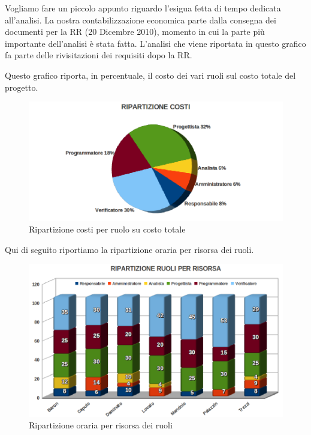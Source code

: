 \vspace{0.8cm}
 
Vogliamo fare un piccolo appunto riguardo l'esigua fetta di tempo dedicata
all'analisi. La nostra contabilizzazione economica parte dalla consegna dei documenti per 
la RR (20 Dicembre 2010), momento in cui la parte pi\`u importante dell'analisi \`e stata fatta.
L'analisi che viene riportata in questo grafico fa parte delle
rivisitazioni dei requisiti dopo la RR.\\
\newpage

Questo grafico riporta, in percentuale, il costo dei vari ruoli sul costo totale
del progetto.

\vspace{0cm}
\begin{figure}[htbp]
  \centering
  \includegraphics[width=17.2cm, angle=0]{img/PP/COSTI.png}
\caption{Ripartizione costi per ruolo su costo totale}
\end{figure}
\vspace{0.5cm}

Qui di seguito riportiamo la ripartizione oraria per risorsa dei ruoli.

\vspace{0cm}
\begin{figure}[htbp!]
  \centering
  \includegraphics[width=17.2cm, angle=0]{img/PP/RISORSE.png}
\caption{Ripartizione oraria per risorsa dei ruoli}
\end{figure}
\vspace{0.5cm}



